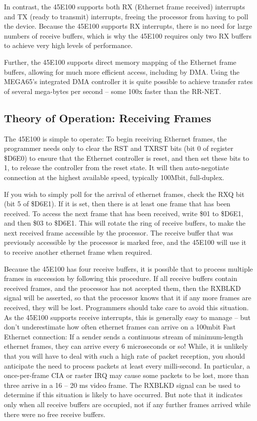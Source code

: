 In contrast, the 45E100 supports both RX (Ethernet frame received) interrupts and TX
(ready to transmit) interrupts, freeing the processor from having to poll
the device. Because the 45E100 supports RX interrupts, there is no need for large
numbers of receive buffers, which is why the 45E100 requires only two RX buffers
to achieve very high levels of performance.

Further, the 45E100 supports direct memory mapping of the
Ethernet frame buffers, allowing for much more efficient access, including
by DMA.  Using the MEGA65's integrated DMA controller it is quite possible
to achieve transfer rates of several mega-bytes per second -- some 100x
faster than the RR-NET.

\subsection{Theory of Operation: Receiving Frames}

The 45E100 is simple to operate: To begin receiving Ethernet frames, the programmer
needs only to clear the RST and TXRST bits (bit 0 of register \$D6E0) to ensure that the 
Ethernet controller is reset, and then set these bits to 1, to release the controller from the reset state.
It will then auto-negotiate connection at the highest available speed, typically 100Mbit, full-duplex.

If you wish to simply poll for the arrival of ethernet frames, check the RXQ bit (bit 5 of \$D6E1).
If it is set, then there is at least one frame that has been received.  To access the next frame that
has been received, write \$01 to \$D6E1, and then \$03 to \$D6E1.  This will rotate the ring of receive
buffers, to make the next received frame accessible by the processor. The receive buffer that was previously
accessible by the processor is marked free, and the 45E100 will use it to receive another ethernet frame when required.

Because the 45E100 has four receive buffers, it is possible that to process multiple frames in succession by
following this procedure. If all receive buffers contain received frames, and the processor has not accepted them, then
the RXBLKD signal will be asserted, so that the processor knows that it if any more frames are received, they will be lost.
Programmers should take care to avoid this situation.  As the 45E100 supports receive interrupts, this is generally easy
to manage -- but don't underestimate how often ethernet frames can arrive on a 100mbit Fast Ethernet connection:
If a sender sends a continuous stream of minimum-length ethernet frames, they can arrive every 6 microseconds or so!
While, it is unlikely that you will have to deal with such a high rate of packet reception, you should anticipate the need
to process packets at least every milli-second. In particular, a once-per-frame CIA or raster IRQ may cause some packets
to be lost, more than three arrive in a 16 -- 20 ms video frame.  The RXBLKD signal can be used to determine if this situation
is likely to have occurred. But note that it indicates only when all receive buffers are occupied, not if any further frames
arrived while there were no free receive buffers.

